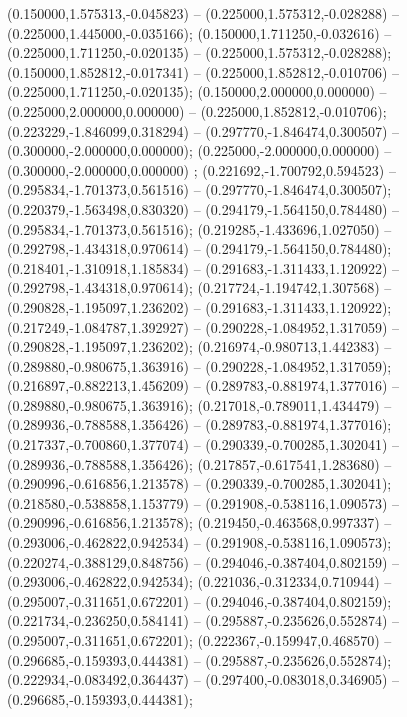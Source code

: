  (0.150000,1.575313,-0.045823) -- (0.225000,1.575312,-0.028288) -- (0.225000,1.445000,-0.035166);
 (0.150000,1.711250,-0.032616) -- (0.225000,1.711250,-0.020135) -- (0.225000,1.575312,-0.028288);
 (0.150000,1.852812,-0.017341) -- (0.225000,1.852812,-0.010706) -- (0.225000,1.711250,-0.020135);
 (0.150000,2.000000,0.000000) -- (0.225000,2.000000,0.000000) -- (0.225000,1.852812,-0.010706);
 (0.223229,-1.846099,0.318294) -- (0.297770,-1.846474,0.300507) -- (0.300000,-2.000000,0.000000);
 (0.225000,-2.000000,0.000000) -- (0.300000,-2.000000,0.000000) ;
 (0.221692,-1.700792,0.594523) -- (0.295834,-1.701373,0.561516) -- (0.297770,-1.846474,0.300507);
 (0.220379,-1.563498,0.830320) -- (0.294179,-1.564150,0.784480) -- (0.295834,-1.701373,0.561516);
 (0.219285,-1.433696,1.027050) -- (0.292798,-1.434318,0.970614) -- (0.294179,-1.564150,0.784480);
 (0.218401,-1.310918,1.185834) -- (0.291683,-1.311433,1.120922) -- (0.292798,-1.434318,0.970614);
 (0.217724,-1.194742,1.307568) -- (0.290828,-1.195097,1.236202) -- (0.291683,-1.311433,1.120922);
 (0.217249,-1.084787,1.392927) -- (0.290228,-1.084952,1.317059) -- (0.290828,-1.195097,1.236202);
 (0.216974,-0.980713,1.442383) -- (0.289880,-0.980675,1.363916) -- (0.290228,-1.084952,1.317059);
 (0.216897,-0.882213,1.456209) -- (0.289783,-0.881974,1.377016) -- (0.289880,-0.980675,1.363916);
 (0.217018,-0.789011,1.434479) -- (0.289936,-0.788588,1.356426) -- (0.289783,-0.881974,1.377016);
 (0.217337,-0.700860,1.377074) -- (0.290339,-0.700285,1.302041) -- (0.289936,-0.788588,1.356426);
 (0.217857,-0.617541,1.283680) -- (0.290996,-0.616856,1.213578) -- (0.290339,-0.700285,1.302041);
 (0.218580,-0.538858,1.153779) -- (0.291908,-0.538116,1.090573) -- (0.290996,-0.616856,1.213578);
 (0.219450,-0.463568,0.997337) -- (0.293006,-0.462822,0.942534) -- (0.291908,-0.538116,1.090573);
 (0.220274,-0.388129,0.848756) -- (0.294046,-0.387404,0.802159) -- (0.293006,-0.462822,0.942534);
 (0.221036,-0.312334,0.710944) -- (0.295007,-0.311651,0.672201) -- (0.294046,-0.387404,0.802159);
 (0.221734,-0.236250,0.584141) -- (0.295887,-0.235626,0.552874) -- (0.295007,-0.311651,0.672201);
 (0.222367,-0.159947,0.468570) -- (0.296685,-0.159393,0.444381) -- (0.295887,-0.235626,0.552874);
 (0.222934,-0.083492,0.364437) -- (0.297400,-0.083018,0.346905) -- (0.296685,-0.159393,0.444381);
